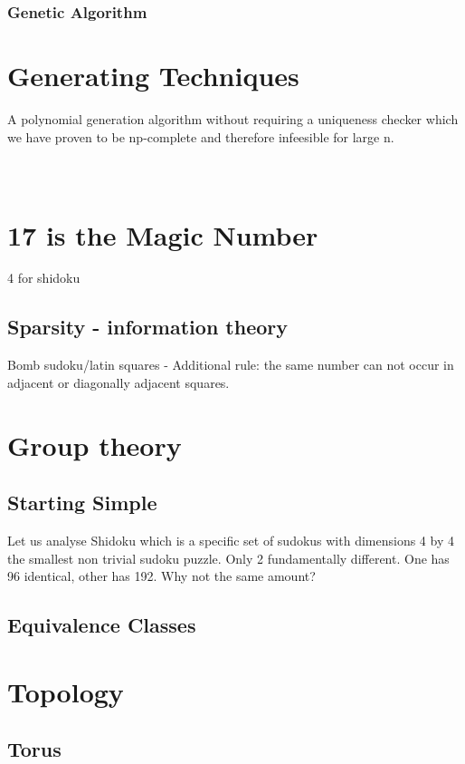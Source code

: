 \documentclass[a4paper,12pt]{article}
\begin{document}
\subsubsection{Genetic Algorithm}
\section{Generating  Techniques}
	A polynomial generation algorithm without requiring a uniqueness checker which we have proven to be np-complete and therefore infeesible for large n.
~~~~~~~~~~~~~~~~~~~~~~~~~~~~~~~~~~~~~~~~~~~~~~~~~~~~~~~~~~~~~~~~~~~~~~~~~~~~~~ %
\section{17 is the Magic Number}
	4 for shidoku
	\subsection{Sparsity - information theory}
		Bomb sudoku/latin squares - Additional rule: the same number can not occur in adjacent or diagonally adjacent squares.
\section{Group theory}
	\subsection{Starting Simple}
		Let us analyse Shidoku which is a specific set of sudokus with dimensions 4 by 4 the smallest non trivial sudoku puzzle. Only 2 fundamentally different. One has 96 identical, other has 192. Why not the same amount?
	\subsection{Equivalence Classes}
\section{Topology}
	\subsection{Torus}
\end{document}
